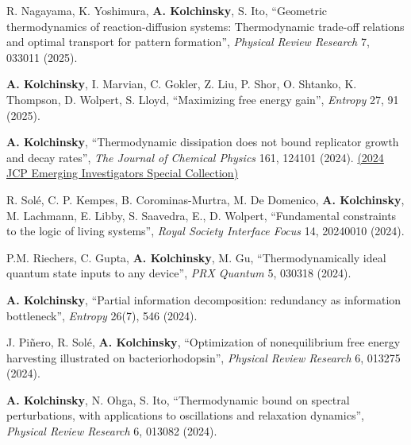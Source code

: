 R. Nagayama, K. Yoshimura, \textbf{A. Kolchinsky}, S. Ito, ``Geometric thermodynamics of reaction-diffusion systems: Thermodynamic trade-off relations and optimal transport for pattern formation'', \emph{Physical Review Research} 7, 033011 (2025).   %
 
\textbf{A. Kolchinsky}\CA, I. Marvian, C. Gokler, Z. Liu, P. Shor, O. Shtanko, K. Thompson, D. Wolpert, S. Lloyd, ``Maximizing free energy gain'', \emph{Entropy} 27, 91 (2025).   %

\textbf{A. Kolchinsky}, ``Thermodynamic dissipation does not bound replicator growth and decay rates'', \emph{The Journal of Chemical Physics} 161, 124101 (2024).   \href{https://pubs.aip.org/collection/330788/2024-JCP-Emerging-Investigators-Special-Collection}{(2024 JCP Emerging Investigators Special Collection)} %

R. Solé, C. P. Kempes, B. Corominas-Murtra, M. De Domenico, \textbf{A. Kolchinsky}, M. Lachmann, E. Libby, S. Saavedra, E., D. Wolpert, ``Fundamental constraints to the logic of living systems'', \emph{Royal Society Interface Focus} 14, 20240010 (2024).  

P.M. Riechers, C. Gupta, \textbf{A. Kolchinsky}, M. Gu, ``Thermodynamically ideal quantum state inputs to any device'', \emph{PRX Quantum} 5, 030318 (2024).  

\textbf{A. Kolchinsky}, ``Partial information decomposition: redundancy as information bottleneck'', \emph{Entropy} 26(7), 546 (2024).  

J. Piñero, R. Solé, \textbf{A. Kolchinsky}\CA, ``Optimization of nonequilibrium free energy harvesting illustrated on bacteriorhodopsin'', \emph{Physical Review Research} 6, 013275 (2024).  

\textbf{A. Kolchinsky}\CA, N. Ohga, S. Ito, ``Thermodynamic bound on spectral perturbations, with applications to oscillations and relaxation dynamics'', \emph{Physical Review Research} 6, 013082 (2024).  

